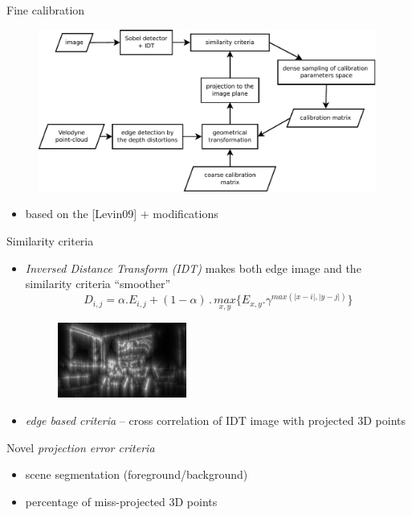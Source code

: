 \documentclass[pdf]{beamer}
\begin{document}
	\begin{frame}{Fine calibration}
		\begin{figure}[h]
			\center
			\includegraphics[width=0.99\textwidth]{fig/framework.pdf}
		\end{figure}
		\begin{itemize}
			\item based on the [Levin09] $+$ modifications
		\end{itemize}
	\end{frame}	

	\begin{frame}{Similarity criteria}
		\begin{itemize}
			\item \emph{Inversed Distance Transform (IDT)} makes both edge image and the similarity criteria ``smoother''
			$$
				D_{i,j} = \alpha . E_{i,j} + (1-\alpha)\,.\,\underset{x,y}{max}\{ E_{x,y} . \gamma^{max(\vert x-i \vert, \vert y-j \vert)}\}
			$$
			\begin{figure}[h]
				\center
				\includegraphics[width=0.4\textwidth]{fig/edges_idt.png}
			\end{figure}
			\item \emph{edge based criteria} -- cross correlation of IDT image with projected $3$D points
		\end{itemize}
		
		\begin{block}{Novel \emph{projection error criteria}}
			\begin{itemize}
				\item scene segmentation (foreground/background)
				\item percentage of miss-projected $3$D points
			\end{itemize}
		\end{block}
	
	\end{frame}
	
\end{document}
